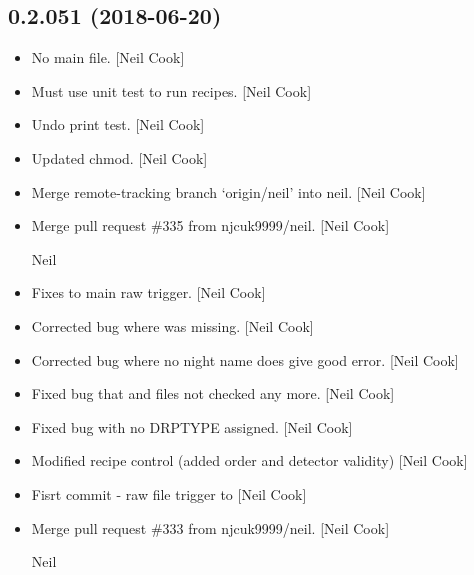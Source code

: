 \documentclass[a4paper,10pt,english]{report}
\begin{document}
\subsection{0.2.051 (2018-06-20)}
\label{\detokenize{misc/changelog:id414}}\begin{itemize}
\item {} 
No main file. {[}Neil Cook{]}

\item {} 
Must use unit test to run recipes. {[}Neil Cook{]}

\item {} 
Undo print test. {[}Neil Cook{]}

\item {} 
Updated chmod. {[}Neil Cook{]}

\item {} 
Merge remote-tracking branch ‘origin/neil’ into neil. {[}Neil Cook{]}

\item {} 
Merge pull request \#335 from njcuk9999/neil. {[}Neil Cook{]}

Neil

\item {} 
Fixes to main raw trigger. {[}Neil Cook{]}

\item {} 
Corrected bug where  was missing. {[}Neil Cook{]}

\item {} 
Corrected bug where no night name does give good error. {[}Neil Cook{]}

\item {} 
Fixed bug that  and files not checked any more. {[}Neil
Cook{]}

\item {} 
Fixed bug with no DRPTYPE assigned. {[}Neil Cook{]}

\item {} 
Modified recipe control (added order and detector validity) {[}Neil
Cook{]}

\item {} 
Fisrt commit - raw file trigger  to  {[}Neil Cook{]}

\item {} 
Merge pull request \#333 from njcuk9999/neil. {[}Neil Cook{]}

Neil

\end{itemize}
\end{document}
